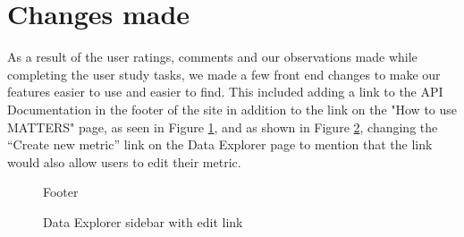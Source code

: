 	\section{Changes made}

		As a result of the user ratings, comments and our observations made while completing 
		the user study tasks, we made a few front end changes to make our features easier 
		to use and easier to find. This included adding a link to the API Documentation in 
		the footer of the site in addition to the link on the "How to use MATTERS" page, as seen 
		in Figure \ref{fig:footer}, and as shown in Figure \ref{fig:edit}, changing the “Create new metric” link on the 
		Data Explorer page to mention that the link would also allow users to edit their metric. 
		
			\begin{figure}[t]
				\centering
					\caption{Footer}
					\label{fig:footer}
			\end{figure}
			
			\begin{figure}[t]
				\centering
					\caption{Data Explorer sidebar with edit link}
					\label{fig:edit}
			\end{figure}
			
